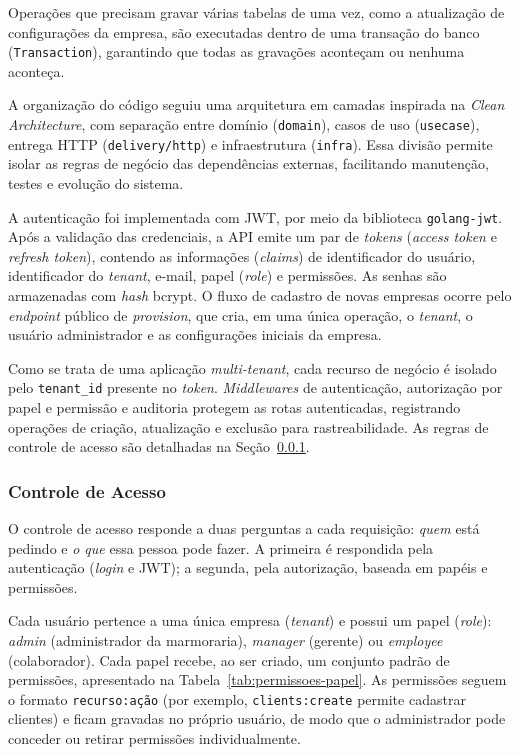 Operações que precisam gravar várias tabelas de uma vez, como a atualização de configurações da empresa, são executadas dentro de uma transação do banco (\texttt{Transaction}), garantindo que todas as gravações aconteçam ou nenhuma aconteça.

A organização do código seguiu uma arquitetura em camadas inspirada na \textit{Clean Architecture}, com separação entre domínio (\texttt{domain}), casos de uso (\texttt{usecase}), entrega HTTP (\texttt{delivery/\allowbreak{}http}) e infraestrutura (\texttt{infra}). Essa divisão permite isolar as regras de negócio das dependências externas, facilitando manutenção, testes e evolução do sistema.

A autenticação foi implementada com JWT, por meio da biblioteca \texttt{golang-jwt}. Após a validação das credenciais, a API emite um par de \textit{tokens} (\textit{access token} e \textit{refresh token}), contendo as informações (\textit{claims}) de identificador do usuário, identificador do \textit{tenant}, e-mail, papel (\textit{role}) e permissões. As senhas são armazenadas com \textit{hash} bcrypt. O fluxo de cadastro de novas empresas ocorre pelo \textit{endpoint} público de \textit{provision}, que cria, em uma única operação, o \textit{tenant}, o usuário administrador e as configurações iniciais da empresa.

Como se trata de uma aplicação \textit{multi-tenant}, cada recurso de negócio é isolado pelo \texttt{tenant\_id} presente no \textit{token}. \textit{Middlewares} de autenticação, autorização por papel e permissão e auditoria protegem as rotas autenticadas, registrando operações de criação, atualização e exclusão para rastreabilidade. As regras de controle de acesso são detalhadas na Seção~\ref{sec:controle-acesso}.

\subsubsection{Controle de Acesso}
\label{sec:controle-acesso}

O controle de acesso responde a duas perguntas a cada requisição: \emph{quem} está pedindo e \emph{o que} essa pessoa pode fazer. A primeira é respondida pela autenticação (\textit{login} e JWT); a segunda, pela autorização, baseada em papéis e permissões.

Cada usuário pertence a uma única empresa (\textit{tenant}) e possui um papel (\textit{role}): \textit{admin} (administrador da marmoraria), \textit{manager} (gerente) ou \textit{employee} (colaborador). Cada papel recebe, ao ser criado, um conjunto padrão de permissões, apresentado na Tabela~\ref{tab:permissoes-papel}. As permissões seguem o formato \texttt{recurso:ação} (por exemplo, \texttt{clients:create} permite cadastrar clientes) e ficam gravadas no próprio usuário, de modo que o administrador pode conceder ou retirar permissões individualmente.

